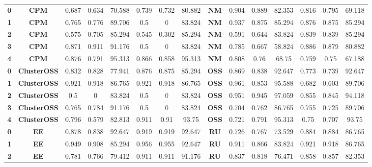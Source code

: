{{\begin{tabular}{c|c|cccccc|ccccccc}
\textbf{0} & \textbf{CPM} & 0.687 & 0.634 & 70.588 & 0.739 & 0.732 & 80.882 & \multicolumn{1}{c|}{\textbf{NM}} & 0.904 & 0.889 & 82.353 & 0.816 & 0.795 & 69.118 \\
\textbf{1} & \textbf{CPM} & 0.765 & 0.776 & 89.706 & 0.5   & 0     & 83.824 & \multicolumn{1}{c|}{\textbf{NM}} & 0.937 & 0.875 & 85.294 & 0.876 & 0.875 & 85.294 \\
\textbf{2} & \textbf{CPM} & 0.575 & 0.705 & 85.294 & 0.545 & 0.302 & 85.294 & \multicolumn{1}{c|}{\textbf{NM}} & 0.591 & 0.644 & 83.824 & 0.839 & 0.839 & 85.294 \\
\textbf{3} & \textbf{CPM} & 0.871 & 0.911 & 91.176 & 0.5   & 0     & 83.824 & \multicolumn{1}{c|}{\textbf{NM}} & 0.785 & 0.667 & 58.824 & 0.886 & 0.879 & 80.882 \\
\textbf{4} & \textbf{CPM} & 0.876 & 0.791 & 95.313 & 0.866 & 0.858 & 95.313 & \multicolumn{1}{c|}{\textbf{NM}} & 0.808 & 0.76  & 68.75 & 0.759 & 0.75  & 67.188 \\
\textbf{0} & \textbf{ClusterOSS} & 0.832 & 0.828 & 77.941 & 0.876 & 0.875 & 85.294 & \multicolumn{1}{c|}{\textbf{OSS}} & 0.869 & 0.838 & 92.647 & 0.773 & 0.739 & 92.647 \\
\textbf{1} & \textbf{ClusterOSS} & 0.921 & 0.918 & 86.765 & 0.921 & 0.918 & 86.765 & \multicolumn{1}{c|}{\textbf{OSS}} & 0.961 & 0.853 & 95.588 & 0.682 & 0.603 & 89.706 \\
\textbf{2} & \textbf{ClusterOSS} & 0.5   & 0     & 83.824 & 0.5   & 0     & 83.824 & \multicolumn{1}{c|}{\textbf{OSS}} & 0.951 & 0.945 & 97.059 & 0.855 & 0.845 & 94.118 \\
\textbf{3} & \textbf{ClusterOSS} & 0.765 & 0.784 & 91.176 & 0.5   & 0     & 83.824 & \multicolumn{1}{c|}{\textbf{OSS}} & 0.704 & 0.762 & 86.765 & 0.755 & 0.725 & 89.706 \\
\textbf{4} & \textbf{ClusterOSS} & 0.796 & 0.579 & 82.813 & 0.911 & 0.91  & 93.75 & \multicolumn{1}{c|}{\textbf{OSS}} & 0.721 & 0.791 & 95.313 & 0.75  & 0.707 & 93.75 \\
\textbf{0} & \textbf{EE} & 0.878 & 0.838 & 92.647 & 0.919 & 0.919 & 92.647 & \multicolumn{1}{c|}{\textbf{RU}} & 0.726 & 0.767 & 73.529 & 0.884 & 0.884 & 86.765 \\
\textbf{1} & \textbf{EE} & 0.949 & 0.908 & 85.294 & 0.956 & 0.955 & 92.647 & \multicolumn{1}{c|}{\textbf{RU}} & 0.911 & 0.866 & 83.824 & 0.921 & 0.918 & 86.765 \\
\textbf{2} & \textbf{EE} & 0.781 & 0.766 & 79.412 & 0.911 & 0.911 & 91.176 & \multicolumn{1}{c|}{\textbf{RU}} & 0.837 & 0.818 & 76.471 & 0.858 & 0.857 & 82.353 \\

\end{tabular}}}
